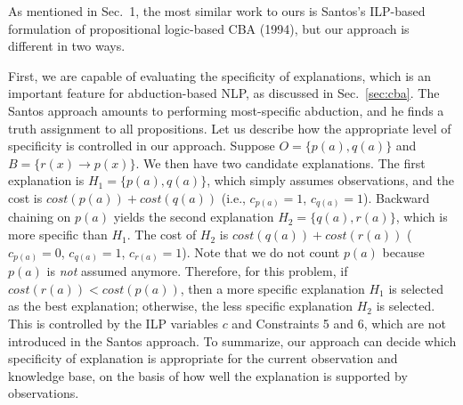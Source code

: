 \documentclass[english]{jnlp_1.4}
\begin{document}
As mentioned in Sec.~1, the most similar work to ours is
Santos\nocite{Santos94}'s ILP-based formulation of propositional logic-based CBA
(1994), but our approach is different in two ways.

First, we are capable of evaluating the specificity of explanations, which is an
important feature for abduction-based NLP, as discussed in Sec.~\ref{sec:cba}.
The Santos approach amounts to performing most-specific abduction, and he finds
a truth assignment to all propositions. Let us describe how the appropriate
level of specificity is controlled in our approach. Suppose $O=\{p(a), q(a)\}$
and $B=\{r(x) \rightarrow p(x)\}$. We then have two candidate explanations. The
first explanation is $H_1 = \{p(a), q(a)\}$, which simply assumes observations,
and the cost is $cost(p(a)) + cost(q(a))$ (i.e., $c_{p(a)}=1$, $c_{q(a)}=1$).
Backward chaining on $p(a)$ yields the second explanation $H_2 = \{q(a),
r(a)\}$, which is more specific than $H_1$. The cost of $H_2$ is $cost(q(a)) +
cost(r(a))$ ($c_{p(a)}=0$, $c_{q(a)}=1$, $c_{r(a)}=1$). Note that we do not
count $p(a)$ because $p(a)$ is \emph{not} assumed anymore. Therefore, for this
problem, if $cost(r(a)) < cost(p(a))$, then a more specific explanation $H_1$ is
selected as the best explanation; otherwise, the less specific explanation $H_2$
is selected. This is controlled by the ILP variables $c$
and Constraints 5 and 6, which are not introduced in the Santos approach.
To summarize, our approach can decide which specificity of explanation is
appropriate for the current observation and knowledge base, on the basis of how
well the explanation is supported by observations.
\end{document}
